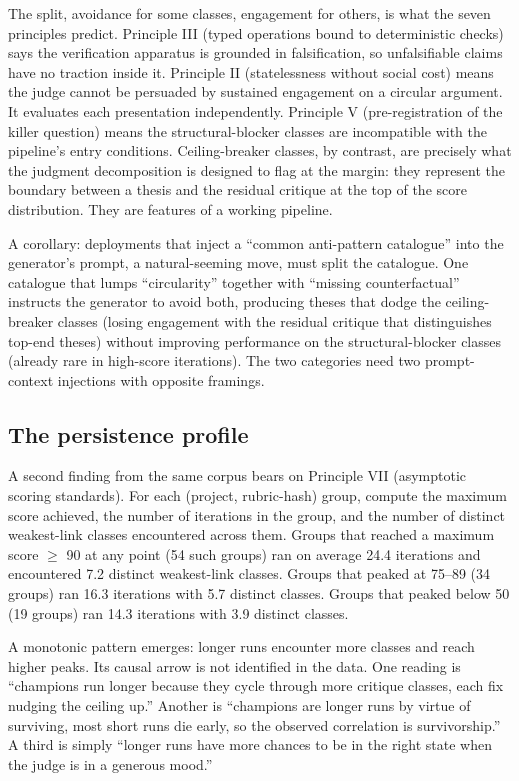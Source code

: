 \documentclass[
  11pt,
]{article}
\begin{document}
The split, avoidance for some classes, engagement for others, is what the
seven principles predict. Principle III (typed operations bound to
deterministic checks) says the verification apparatus is grounded in
falsification, so unfalsifiable claims have no traction inside it.
Principle II (statelessness without social cost) means the judge cannot be
persuaded by sustained engagement on a circular argument. It evaluates
each presentation independently. Principle V (pre-registration of the
killer question) means the structural-blocker classes are incompatible
with the pipeline's entry conditions. Ceiling-breaker classes, by
contrast, are precisely what the judgment decomposition is designed to
flag at the margin: they represent the boundary between a thesis and the
residual critique at the top of the score distribution. They are features
of a working pipeline.

A corollary: deployments that inject a
``common anti-pattern catalogue'' into the generator's prompt, a
natural-seeming move, must split the catalogue. One catalogue that
lumps ``circularity'' together with ``missing counterfactual''
instructs the generator to avoid both, producing theses that dodge
the ceiling-breaker classes (losing engagement with the residual
critique that distinguishes top-end theses) without improving performance
on the structural-blocker classes (already rare in high-score
iterations). The two categories need two prompt-context injections with
opposite framings.

\subsection{The persistence profile}\label{the-persistence-profile}

A second finding from the same corpus bears on Principle VII (asymptotic
scoring standards). For each (project, rubric-hash) group, compute the
maximum score achieved, the number of iterations in the group, and the
number of distinct weakest-link classes encountered across them. Groups
that reached a maximum score \(\geq\) 90 at any point (54 such groups) ran
on average 24.4 iterations and encountered 7.2 distinct weakest-link
classes. Groups that peaked at 75--89 (34 groups) ran 16.3 iterations with
5.7 distinct classes. Groups that peaked below 50 (19 groups) ran 14.3
iterations with 3.9 distinct classes.

A monotonic pattern emerges: longer runs encounter more classes and reach
higher peaks. Its causal arrow is not identified in the data. One reading
is ``champions run longer because they cycle through more critique
classes, each fix nudging the ceiling up.'' Another is ``champions are
longer runs by virtue of surviving, most short runs die early, so the
observed correlation is survivorship.'' A third is simply ``longer runs
have more chances to be in the right state when the judge is in a generous
mood.''
\end{document}
